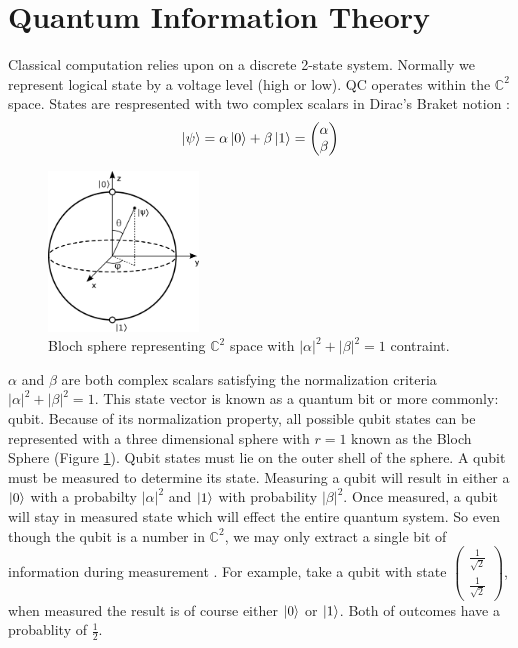 \documentclass[conference]{IEEEtran}
\begin{document}
\section{Quantum Information Theory}

Classical computation relies upon on a discrete 2-state system. Normally we represent logical state by a voltage level (high or low). QC operates within the $\mathbb{C}^2$ space. States are respresented with two complex scalars in Dirac's Braket notion \cite{b1}:
\begin{equation*}
\ket{\psi} = \alpha\ket{0} + \beta\ket{1} = \begin{pmatrix}
	\alpha\\
	\beta
	\end{pmatrix}
\end{equation*}

\begin{figure}[htbp]
\centerline{\includegraphics[width=4cm]{bloch_sphere}}
\caption{Bloch sphere representing $\mathbb{C}^2$ space with $|\alpha|^2 + |\beta|^2=1$ contraint.}
\label{bloch_sphere}
\end{figure}

$\alpha$ and $\beta$ are both complex scalars satisfying the normalization criteria $|\alpha|^2 + |\beta|^2=1$. This state vector is known as a quantum bit or more commonly: qubit. Because of its normalization property, all possible qubit states can be represented with a three dimensional sphere with $r=1$ known as the Bloch Sphere (Figure \ref{bloch_sphere}). Qubit states must lie on the outer shell of the sphere. A qubit must be measured to determine its state. Measuring a qubit will result in either a $\ket{0}$ with a probabilty $|\alpha|^2$ and $\ket{1}$ with probability $|\beta|^2$. Once measured, a qubit will stay in measured state which will effect the entire quantum system. So even though the qubit is a number in $\mathbb{C}^2$, we may only extract a single bit of information during measurement \cite{b5}. For example, take a qubit with state $\begin{pmatrix}
	\frac{1}{\sqrt{2}}\\
	\frac{1}{\sqrt{2}}
	\end{pmatrix}$, when measured the result is of course either $\ket{0}$ or $\ket{1}$. Both of outcomes have a probablity of $\frac{1}{2}$.
\end{document}
